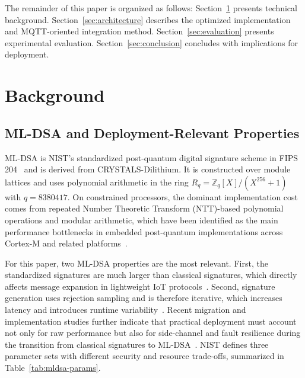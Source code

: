 \documentclass[final, twoside]{IEEEtran} %
\begin{document}
The remainder of this paper is organized as follows: Section~\ref{sec:related} presents technical background. Section~\ref{sec:architecture} describes the optimized implementation and MQTT-oriented integration method. Section~\ref{sec:evaluation} presents experimental evaluation. Section~\ref{sec:conclusion} concludes with implications for deployment.

\section{Background}\label{sec:related}

\subsection{ML-DSA and Deployment-Relevant Properties}\label{sec:complexity}

ML-DSA is NIST's standardized post-quantum digital signature scheme in FIPS 204~\cite{NIST-FIPS-204} and is derived from CRYSTALS-Dilithium. It is constructed over module lattices and uses polynomial arithmetic in the ring $R_q = \mathbb{Z}_q[X]/(X^{256}+1)$ with $q = 8380417$. On constrained processors, the dominant implementation cost comes from repeated Number Theoretic Transform (NTT)-based polynomial operations and modular arithmetic, which have been identified as the main performance bottlenecks in embedded post-quantum implementations across Cortex-M and related platforms~\cite{Benchmark2022,pqm4-benchmarks,Barrett2023,Wei2025}.

For this paper, two ML-DSA properties are the most relevant. First, the standardized signatures are much larger than classical signatures, which directly affects message expansion in lightweight IoT protocols~\cite{NIST-FIPS-204}. Second, signature generation uses rejection sampling and is therefore iterative, which increases latency and introduces runtime variability~\cite{NIST-FIPS-204}. Recent migration and implementation studies further indicate that practical deployment must account not only for raw performance but also for side-channel and fault resilience during the transition from classical signatures to ML-DSA~\cite{Li2024,Dinu2025}. NIST defines three parameter sets with different security and resource trade-offs, summarized in Table~\ref{tab:mldsa-params}.
\end{document}
